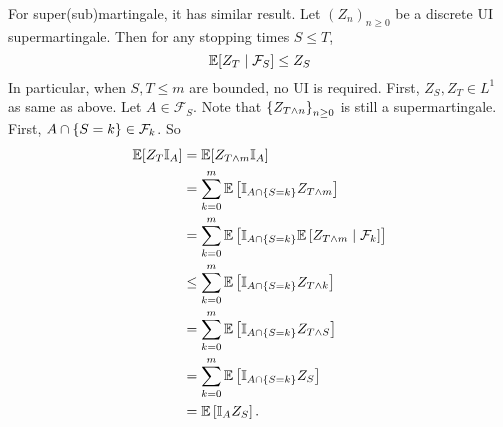 \begin{rmk}
    For super(sub)martingale, it has similar result.  Let $(Z_n)_{n \geq 0}$ be a discrete UI supermartingale. Then for any stopping times $S \leq T$,
    \begin{equation*}
        \mathbb{E}[Z_T \mid \mathcal{F}_S] \leq Z_S
    \end{equation*}
    In particular, when $S,T \leq m$ are bounded, no UI is required. First, $Z_S,Z_T \in L^1$ as same as above. Let $A \in \mathcal{F}_S$. Note that $\left\{Z_{T \wedge n}\right\}_{n \geq 0}$ is still a supermartingale. First, $A \cap \left\{S = k\right\} \in \mathcal{F}_k$. So
    \begin{align*}
        \mathbb{E}[Z_T \mathbb{I}_A] &= \mathbb{E}[Z_{T\wedge m} \mathbb{I}_A] \\
        &= \sum_{k=0}^m \mathbb{E}\left[\mathbb{I}_{A \cap \left\{S = k\right\}} Z_{T \wedge m}\right] \\
        &= \sum_{k=0}^m \mathbb{E}\left[\mathbb{I}_{A \cap \left\{S = k\right\}} \mathbb{E}\left[Z_{T \wedge m} \mid \mathcal{F}_k\right]\right]\\
        &\leq \sum_{k=0}^m \mathbb{E}\left[\mathbb{I}_{A \cap \left\{S = k\right\}} Z_{T \wedge k}\right] \\
        &= \sum_{k=0}^m \mathbb{E}\left[\mathbb{I}_{A \cap \left\{S = k\right\}} Z_{T \wedge S}\right] \\
        &= \sum_{k=0}^m \mathbb{E}\left[\mathbb{I}_{A \cap \left\{S = k\right\}} Z_{S}\right] \\
        &= \mathbb{E}\left[\mathbb{I}_A Z_S\right].
    \end{align*}
\end{rmk}


